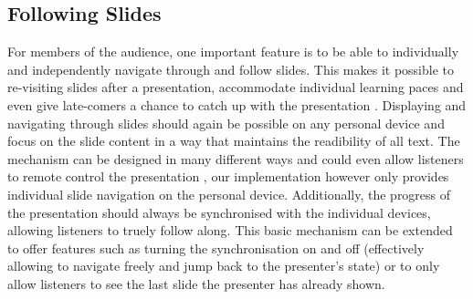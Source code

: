 \subsection{Following Slides}
For members of the audience, one important feature is to be able to individually and independently navigate through and follow slides. This makes it possible to re-visiting slides after a presentation, accommodate individual learning paces \cite{Cheng:TreebasedOnlinePresentations} and even give late-comers a chance to catch up with the presentation \cite{Chattopadhyay:OfficeSocialRemoteControl}. Displaying and navigating through slides should again be possible on any personal device and focus on the slide content in a way that maintains the readibility of all text. The mechanism can be designed in many different ways and could even allow listeners to remote control the presentation \cite{Chattopadhyay:OfficeSocialRemoteControl}, our implementation however only provides individual slide navigation on the personal device. Additionally, the progress of the presentation should always be synchronised with the individual devices, allowing listeners to truely follow along. This basic mechanism can be extended to offer features such as turning the synchronisation on and off (effectively allowing to navigate freely and jump back to the presenter's state) or to only allow listeners to see the last slide the presenter has already shown.

